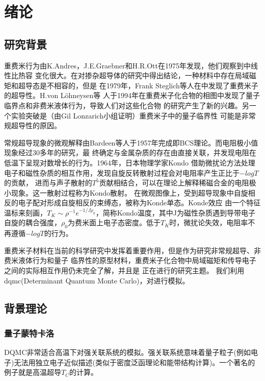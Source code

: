 \section{绪论}
\subsection{研究背景}
重费米行为由K.Andres，J.E.Graebner和H.R.Ott在1975年发现，他们观察到中线性比热容
变化很大。在对掺杂超导体的研究中得出结论，一种材料中存在局域磁矩和超导态是不相容的，但是
在1979年，Frank Steglich等人在中发现了重费米子的超导性。H.von Löhneysen等
人于1994年在重费米子化合物的相图中发现了量子临界点和非费米液体行为，导致人们对这些化合物
的研究产生了新的兴趣。另一个实验突破是（由Gil Lonzarich小组证明）重费米子中的量子临界性
可能是非常规超导性的原因。

常规超导现象的微观解释由Bardeen等人于1957年完成即BCS理论。而电阻极小值现象经过30多年的研究，最
终确定与金属杂质的存在由直接关联，并发现电阻在低温下呈现对数增长的行为。1964年，日本物理学家Kondo
借助微扰论方法处理电子和磁性杂质的相互作用，发现自旋反转散射过程会对电阻率产生正比于$-logT$的贡献，
进而与声子散射的$T^5$贡献相结合，可以在理论上解释稀磁合金的电阻极小现象。这一散射过程称为Kondo散射。
在微观图像上，受到超导现象中自旋相反的电子配对形成自旋相反的束缚态，被称为Konde单态。Konde效应
由一个特征温标来刻画，$T_K \sim \rho^{-1}e^{-1/J \rho_0}$，简称Kondo温度，其中J为磁性杂质遇到导带电子自旋的耦合强度，$\rho_0$为费米面上电子态密度。低于$T_K$时，微扰论失效，电阻率不再遵循$-logT$的行为。

重费米子材料在当前的科学研究中发挥着重要作用，但是作为研究非常规超导、非费米液体行为和量子
临界性的原型材料，重费米子化合物中局域磁矩和传导电子之间的实际相互作用仍未完全了解，并且是
正在进行的研究主题。
我们利用dqmc(Determinant Quantum Monte Carlo)，对进行模拟。

\subsection{背景理论}
\subsubsection{量子蒙特卡洛}
DQMC非常适合高温下对强关联系统的模拟。强关联系统意味着量子粒子(例如电子)无法用独立电子近似描述(类似于密度泛函理论和能带结构计算)。一个著名的例子就是高温超导$T_C$的计算。


